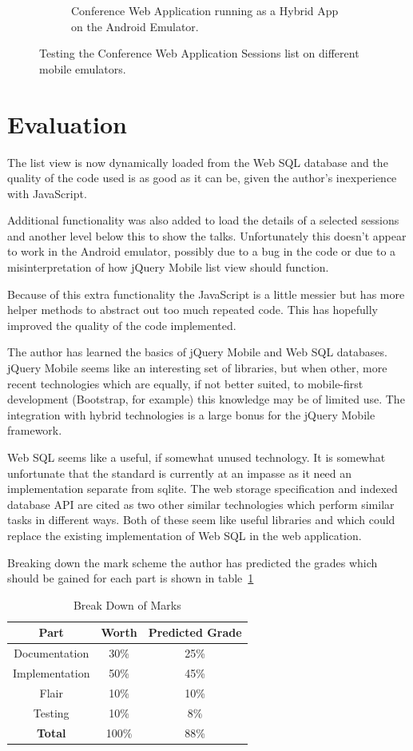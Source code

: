 \documentclass[11pt, a4paper]{article}
\begin{document}
\begin{figure}[h]
\begin{subfigure}[b]{0.4\textwidth}
\caption{Conference Web Application running as a Hybrid App on the Android
         Emulator.}
\end{subfigure}
\caption{Testing the Conference Web Application Sessions list on different
         mobile emulators.}
\label{fig:testing}
\end{figure}


\section{Evaluation}
The list view is now dynamically loaded from the Web SQL database and the
quality of the code used is as good as it can be, given the author's
inexperience with JavaScript.

Additional functionality was also added to load the details of a selected
sessions and another level below this to show the talks. Unfortunately this
doesn't appear to work in the Android emulator, possibly due to a bug in the
code or due to a misinterpretation of how jQuery Mobile list view should
function.

Because of this extra functionality the JavaScript is a little messier but has
more helper methods to abstract out too much repeated code. This has hopefully
improved the quality of the code implemented.

The author has learned the basics of jQuery Mobile and Web SQL databases.
jQuery Mobile seems like an interesting set of libraries, but when other, more
recent technologies which are equally, if not better suited, to mobile-first
development (Bootstrap, for example) this knowledge may be of limited use. The
integration with hybrid technologies is a large bonus for the jQuery Mobile
framework.

Web SQL seems like a useful, if somewhat unused technology. It is somewhat
unfortunate that the standard is currently at an impasse as it need an
implementation separate from sqlite. The web storage specification and indexed
database API are cited as two other similar technologies which perform similar
tasks in different ways. Both of these seem like useful libraries and which
could replace the existing implementation of Web SQL in the web application.

Breaking down the mark scheme the author has predicted the grades which should
be gained for each part is shown in table~\ref{tab:marks}

\begin{table}[h]
\centering
\begin{tabular}{| c | c | c |}\hline
\textbf{Part}	& \textbf{Worth}	& \textbf{Predicted Grade} \\ \hline
Documentation	& 30\%			& 25\% \\ 
Implementation	& 50\%			& 45\% \\ 
Flair		& 10\%			& 10\% \\ 
Testing		& 10\%			& 8\% \\ \hline
\textbf{Total}	& 100\%			& 88\% \\ \hline
\end{tabular}
\caption{Break Down of Marks}
\label{tab:marks}
\end{table}
\end{document}
